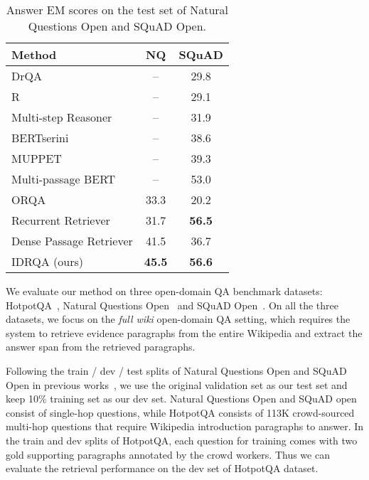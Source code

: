 \documentclass[sigconf]{acmart}
\begin{document}
\setlength\tabcolsep{14pt}
\begin{table}[ht]
\centering
\caption{Answer EM scores on the test set of Natural Questions Open and SQuAD Open.}
\label{table:single hop QA performance on test}
\begin{tabular}{@{}lcc@{}}
\toprule
Method & NQ & SQuAD \\ \midrule
DrQA \citep{chen-etal-2017-reading} & -- & 29.8 \\
R \citep{wang2018r} & -- & 29.1 \\
Multi-step Reasoner \citep{das2018multistep} & -- & 31.9 \\
BERTserini \citep{yang-etal-2019-end-end-open} & -- & 38.6 \\
MUPPET \citep{feldman-el-yaniv-2019-multi} & -- & 39.3 \\
Multi-passage BERT \citep{wang-etal-2019-multi} & -- & 53.0 \\
ORQA \citep{lee-etal-2019-latent} & 33.3 & 20.2 \\
Recurrent Retriever \citep{asai2020learning} & 31.7 & \textbf{56.5} \\
Dense Passage Retriever \citep{karpukhin2020dense} & 41.5 & 36.7 \\
\midrule
IDRQA (ours) & \textbf{45.5} & \textbf{56.6}  \\ \bottomrule
\end{tabular}                                                                  
\end{table}




We evaluate our method on three open-domain QA benchmark datasets: HotpotQA~\cite{yang-etal-2018-hotpotqa}, Natural Questions Open~\cite{lee-etal-2019-latent} and SQuAD Open~\cite{chen-etal-2017-reading}. On all the three datasets, we focus on the \textit{full wiki} open-domain QA setting, which requires the system to retrieve evidence paragraphs from the entire Wikipedia and extract the answer span from the retrieved paragraphs.

Following the train / dev / test splits of Natural Questions Open and SQuAD Open in previous works~\cite{lee-etal-2019-latent,karpukhin2020dense}, we use the original validation set as our test set and keep 10\% training set as our dev set. Natural Questions Open and SQuAD open consist of single-hop questions, while HotpotQA consists of 113K crowd-sourced multi-hop questions that require Wikipedia introduction paragraphs to answer.
In the train and dev splits of HotpotQA, each question for training comes with two gold supporting paragraphs annotated by the crowd workers. Thus we can evaluate the retrieval performance on the dev set of HotpotQA dataset.
\end{document}
